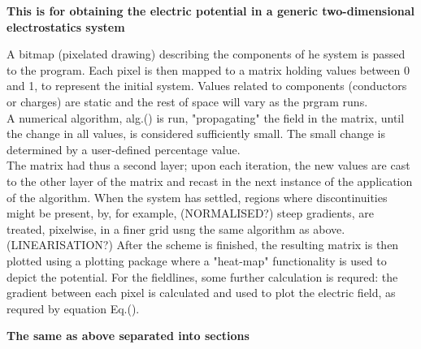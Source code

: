 \documentclass{article}
\begin{document}
  \noindent\textbf{This is for obtaining the electric potential in a generic two-dimensional electrostatics system}

  \vspace{5mm}

	A bitmap (pixelated drawing) describing the components of he system is passed to the program. Each pixel is then 
	 mapped to a matrix holding values between 0 and 1, to represent the initial system. Values related to components
	 (conductors or charges) are static and the rest of space will vary as the prgram runs.\\
	A numerical algorithm, alg.() is run, "propagating" the field in the matrix, until the change in all values, is 
	 considered sufficiently small. The small change is determined by a user-defined percentage value. \\
	The matrix had thus a second layer; upon each iteration, the new values are cast to the other layer of the 
	 matrix and recast in the next instance of the application of the algorithm.
	When the system has settled, regions where discontinuities might be present, by, for example, (NORMALISED?)
	 steep gradients, are treated, pixelwise, in a finer grid usng the same algorithm as above. (LINEARISATION?)
	After the scheme is finished, the resulting matrix is then plotted using a plotting package where  a "heat-map" 
	 functionality is used to depict the potential. For the fieldlines, some further calculation is requred: the 
	 gradient between each pixel is calculated and used to plot the electric field, as requred by equation Eq.().

\vspace{7.5mm}

\noindent\textbf{The same as above separated into sections}

\vspace{5mm}
\end{document}

